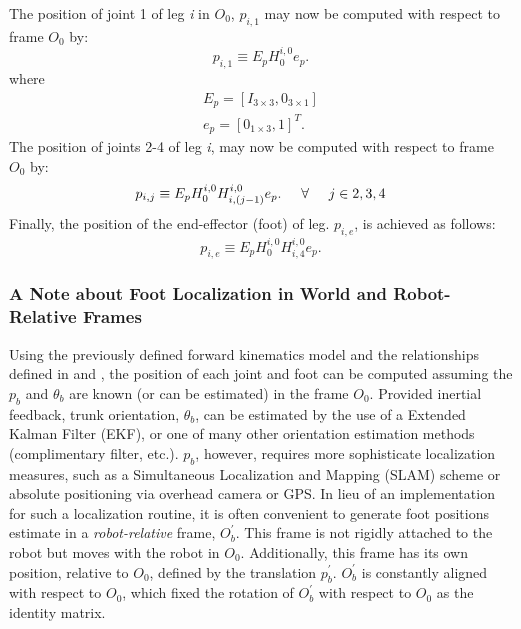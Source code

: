 			\noindent
			The position of joint 1 of leg \emph{i} in $O_{0}$, ${p}_{i,1}$ may now be computed with respect to frame $O_{0}$ by:
				\begin{equation}
					{p}_{i,1} \equiv E_{p} H_{0}^{i,0} e_{p}.
				\end{equation}
			where
				\begin{eqnarray}
					E_{p} = [I_{3\times3},0_{3\times1}]	\nonumber 	\\
					e_{p} = [0_{1\times3},1]^T.			\nonumber 	
				\end{eqnarray}
			The position of joints 2-4 of leg \emph{i}, may now be computed with respect to frame $O_{0}$ by:
				\begin{equation}
					{p}_{i,j} \equiv E_{p} H_{0}^{i,0} {H}^{i,0}_{i,(j-1)} e_{p}. \hspace{5mm} \forall \hspace{5mm} j\in{2,3,4}
					\label{eq::world_joint_positions}
				\end{equation}
			Finally, the position of the end-effector (foot) of \Ith leg. ${p}_{i,e}$, is achieved as follows:
				\begin{equation}
					{p}_{i,e} \equiv E_{p} H_{0}^{i,0} {H}^{i,0}_{i,4} e_{p}.
					\label{eq::world_feet_positions}
				\end{equation}

			\subsubsection{A Note about Foot Localization in World and Robot-Relative Frames}

			Using the previously defined forward kinematics model and the relationships defined in \label{eq::world_joint_positions} and \label{eq::world_feet_positions}, the position of each joint and foot can be computed assuming the $p_{b}$ and $\theta_{b}$ are known (or can be estimated) in the frame $O_{0}$. Provided inertial feedback, trunk orientation, $\theta_{b}$, can be estimated by the use of a Extended Kalman Filter (EKF), or one of many other orientation estimation methods (\IE complimentary filter, etc.). $p_{b}$, however, requires more sophisticate localization measures, such as a Simultaneous Localization and Mapping (SLAM) scheme or absolute positioning via overhead camera or GPS. In lieu of an implementation for such a localization routine, it is often convenient to generate foot positions estimate in a \emph{robot-relative} frame, $O_{b}^{'}$. This frame is not rigidly attached to the robot but moves with the robot in $O_{0}$. Additionally, this frame has its own position, relative to $O_{0}$, defined by the translation $p_{b}^{'}$. $O_{b}^{'}$ is constantly aligned with respect to $O_{0}$, which fixed the rotation of $O_{b}^{'}$ with respect to $O_{0}$ as the identity matrix.

